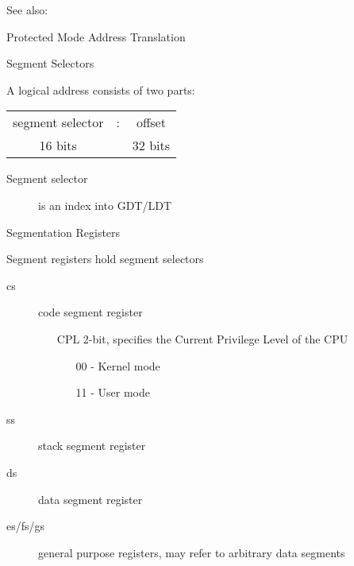 See also: 

\begin{frame}{Protected Mode Address Translation}
  \begin{center}
  \end{center}
\end{frame}

\begin{frame}{Segment Selectors}
  \begin{block}{A logical address consists of two parts:}
    \begin{center}
      \begin{tabular}{ccc}
        segment selector&:&offset\\
        {\scriptsize 16 bits}&&{\scriptsize 32 bits}
      \end{tabular}
    \end{center}
  \end{block}
  \begin{description}
  \item[Segment selector] is an index into GDT/LDT
  \end{description}
  \begin{center}
  \end{center}
\end{frame}

\begin{frame}{Segmentation Registers}
  \begin{block}{Segment registers hold segment selectors}
    \begin{description}
    \item[cs] code segment register
      \begin{itemize}
      \item[CPL] 2-bit, specifies the Current Privilege Level of the CPU
        \begin{itemize}
        \item[00] - Kernel mode
        \item[11] - User mode
        \end{itemize}
      \end{itemize}
    \item[ss] stack segment register
    \item[ds] data segment register
    \item[es/fs/gs] general purpose registers, may refer to arbitrary data segments
    \end{description}
  \end{block}
\end{frame}

